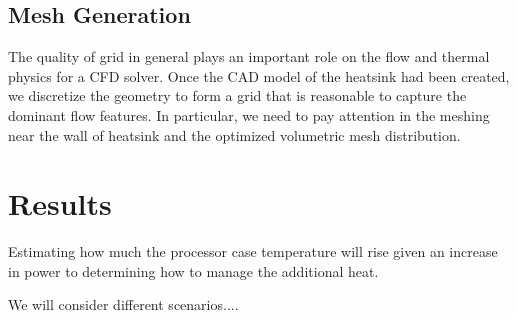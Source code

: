 \documentclass[letterpaper,12pt]{article}
\begin{document}
\begin{center}
\end{center}
\subsection{Mesh Generation}

The quality of grid in general plays an important role on the 
flow and thermal physics for a CFD solver. Once the CAD model of the
heatsink had been created, we discretize the geometry to form a grid that 
is reasonable to capture the dominant flow features. In particular, 
we need to pay attention in the meshing near the wall of heatsink and the
optimized volumetric mesh distribution.
\\
\vfill
\newpage
\clearpage
\section{Results}


Estimating how much the processor case temperature will rise given an increase in power to determining how to manage the additional heat.


We will consider different scenarios....
\end{document}
